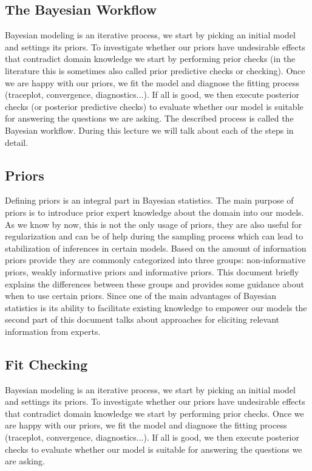\documentclass[fleqn,moreauthors,10pt]{ds_report}
\begin{document}
\subsection*{The Bayesian Workflow}

Bayesian modeling is an iterative process, we start by picking an initial model and settings its priors. To investigate whether our priors have undesirable effects that contradict domain knowledge we start by performing prior checks (in the literature this is sometimes also called prior predictive checks or checking). Once we are happy with our priors, we fit the model and diagnose the fitting process (traceplot, convergence, diagnostics...). If all is good, we then execute posterior checks (or posterior predictive checks) to evaluate whether our model is suitable for answering the questions we are asking. The described process is called the Bayesian workflow. During this lecture we will talk about each of the steps in detail.

\subsection*{Priors}

Defining priors is an integral part in Bayesian statistics. The main purpose of priors is to introduce prior expert knowledge about the domain into our models. As we know by now, this is not the only usage of priors, they are also useful for regularization and can be of help during the sampling process which can lead to stabilization of inferences in certain models. Based on the amount of information priors provide they are commonly categorized into three groups: non-informative priors, weakly informative priors and informative priors. This document briefly explains the differences between these groups and provides some guidance about when to use certain priors. Since one of the main advantages of Bayesian statistics is its ability to facilitate existing knowledge to empower our models the second part of this document talks about approaches for eliciting relevant information from experts.

\subsection*{Fit Checking}

Bayesian modeling is an iterative process, we start by picking an initial model and settings its priors. To investigate whether our priors have undesirable effects that contradict domain knowledge we start by performing prior checks. Once we are happy with our priors, we fit the model and diagnose the fitting process (traceplot, convergence, diagnostics...). If all is good, we then execute posterior checks to evaluate whether our model is suitable for answering the questions we are asking.
\end{document}
